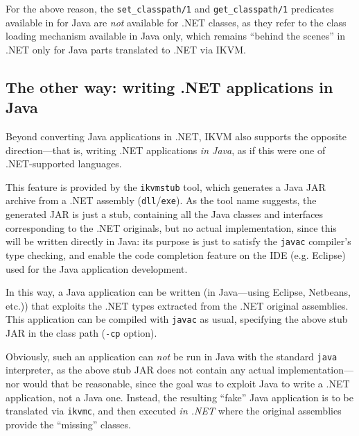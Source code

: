 For the above reason, the \texttt{set\_classpath/1} and \texttt{get\_classpath/1} predicates available in \tuprolog{} for Java are \textit{not} available for .NET classes, as they refer to the class loading mechanism available in Java only, which remains ``behind the scenes'' in \tuprolog{}.NET only for Java parts translated to .NET via IKVM.

\subsection{The other way: writing .NET applications in Java}
\label{ssec:ikvm-writing-app-in-java}

Beyond converting Java applications in .NET, IKVM also supports the opposite direction---that is, writing .NET applications \textit{in Java}, as if this were one of .NET-supported languages.

This feature is provided by the \texttt{ikvmstub} tool, which generates a Java JAR archive from a .NET assembly (\texttt{dll}/\texttt{exe}).
As the tool name suggests, the generated JAR is just a stub, containing all the Java classes and interfaces corresponding to the .NET originals, but no actual implementation, since this will be written directly in Java: its purpose is just to satisfy the \texttt{javac} compiler's type checking, and enable the code completion feature on the IDE (e.g. Eclipse) used for the Java application development.

In this way, a Java application can be written (in Java---using Eclipse, Netbeans, etc.)) that exploits the .NET types extracted from the .NET original assemblies.
This application can be compiled with \texttt{javac} as usual, specifying the above stub JAR in the class path (\texttt{-cp} option).

Obviously, such an application can \textit{not} be run in Java with the standard \texttt{java} interpreter, as the above stub JAR does not contain any actual implementation---nor would that be reasonable, since the goal was to exploit Java to write a .NET application, not a Java one.
%
Instead, the resulting ``fake'' Java application is to be translated via \texttt{ikvmc}, and then executed \textit{in .NET} where the original assemblies provide the ``missing'' classes.

\medskip

